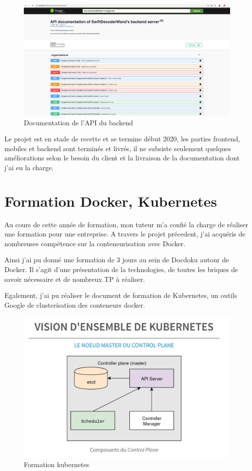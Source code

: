 \documentclass[11pt]{report}
\begin{document}
			\begin{figure}[!htb]
				\center
				\includegraphics[scale = 0.2]{api.png}
				\caption{Documentation de l'API du backend}
			\end{figure}

			Le projet est en stade de recette et se termine début 2020, les parties frontend, mobiles et backend sont terminés et livrés, il ne subsiste seulement quelques améliorations selon le besoin du client et la livraison de la documentation dont j'ai eu la charge.

		\newpage

		\section{Formation Docker, Kubernetes}

		Au cours de cette année de formation, mon tuteur m'a confié la charge de réaliser une formation pour une entreprise.
		A travers le projet précedent, j'ai acquéris de nombreuses compétence sur la conteneurisation avec Docker.

		Ainsi j'ai pu donné une formation de 3 jours au sein de Docdoku autour de Docker. Il s'agit d'une présentation de la technologies, de toutes les briques de savoir nécessaire et de nombreux TP à réaliser.

		Egalement, j'ai pu réaliser le document de formation de Kubernetes, un outils Google de clusterisation des conteneurs docker.

			\begin{figure}[!htb]
				\center
				\includegraphics[scale = 0.2]{k8s.png}
				\caption{Formation kubernetes}
			\end{figure}
\end{document}
